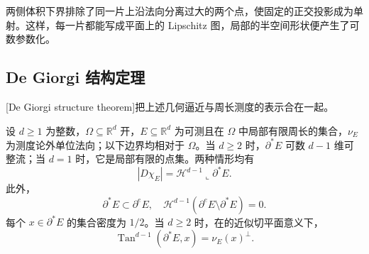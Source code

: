 两侧体积下界排除了同一片上沿法向分离过大的两个点，使固定的正交投影成为单射。这样，每一片都能写成平面上的 Lipschitz 图，局部的半空间形状便产生了可数参数化。

\subsection{De Giorgi 结构定理}
\label{b1:subsec:270503}

[De Giorgi structure theorem]把上述几何逼近与周长测度的表示合在一起。

\begin{theorem}[De Giorgi]\label{b1:thm:de-giorgi-structure}
设 \(d\ge1\) 为整数，\(\Omega\subseteq\mathbb R^d\) 开，\(E\subseteq\mathbb R^d\) 为可测且在 \(\Omega\) 中局部有限周长的集合，\(\nu_E\) 为测度论外单位法向；以下边界均相对于 \(\Omega\)。当 \(d\ge2\) 时，\(\partial^*E\) 可数 \(d-1\) 维可整流；当 \(d=1\) 时，它是局部有限的点集。两种情形均有
\begin{equation}\label{b1:eq:de-giorgi-perimeter-measure}
 |D\chi_E|=\mathcal H^{d-1}\llcorner\partial^*E.
\end{equation}
此外，
\begin{equation}\label{b1:eq:essential-reduced-boundary}
 \partial^*E\subset\partial^eE,\quad
 \mathcal H^{d-1}(\partial^eE\setminus\partial^*E)=0.
\end{equation}
每个 \(x\in\partial^*E\) 的集合密度为 \(1/2\)。当 \(d\ge2\) 时，在的近似切平面意义下，
\[
 \operatorname{Tan}^{d-1}(\partial^*E,x)=\nu_E(x)^\perp.
\]
\end{theorem}
